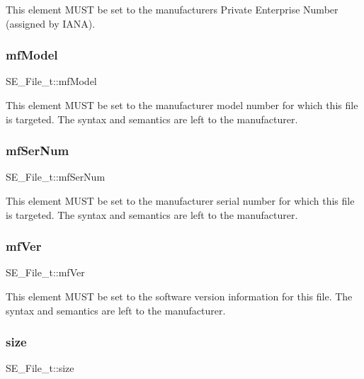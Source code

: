 This element M\+U\+ST be set to the manufacturer\textquotesingle{}s Private Enterprise Number (assigned by I\+A\+NA). \mbox{\label{group__File_ga5e0a19dba9edc6f4b68f377ef065b4b7}} 
\subsubsection{\texorpdfstring{mf\+Model}{mfModel}}
{\footnotesize\ttfamily S\+E\+\_\+\+File\+\_\+t\+::mf\+Model}

This element M\+U\+ST be set to the manufacturer model number for which this file is targeted. The syntax and semantics are left to the manufacturer. \mbox{\label{group__File_ga0811fbd161a3bf54bb0b2c47aaac6d62}} 
\subsubsection{\texorpdfstring{mf\+Ser\+Num}{mfSerNum}}
{\footnotesize\ttfamily S\+E\+\_\+\+File\+\_\+t\+::mf\+Ser\+Num}

This element M\+U\+ST be set to the manufacturer serial number for which this file is targeted. The syntax and semantics are left to the manufacturer. \mbox{\label{group__File_ga89d714f28592f9970532c15f4c5630e3}} 
\subsubsection{\texorpdfstring{mf\+Ver}{mfVer}}
{\footnotesize\ttfamily S\+E\+\_\+\+File\+\_\+t\+::mf\+Ver}

This element M\+U\+ST be set to the software version information for this file. The syntax and semantics are left to the manufacturer. \mbox{\label{group__File_ga19932bde03637ceb3778be45c83d6d26}} 
\subsubsection{\texorpdfstring{size}{size}}
{\footnotesize\ttfamily S\+E\+\_\+\+File\+\_\+t\+::size}

